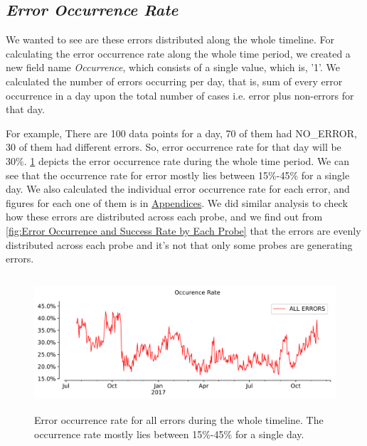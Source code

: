 \subsection*{\textit{Error Occurrence Rate}}

We wanted to see are these errors distributed along the whole timeline. For calculating the error occurrence rate along the whole time period, we created a new field name \textit{Occurrence}, which consists of a single value, which is, '1'.
We calculated the number of errors occurring per day, that is, sum of every error occurrence in a day upon the total number of cases i.e. error plus non-errors for that day.

For example, There are 100 data points for a day, 70 of them had NO\_ERROR, 30 of them had different errors. So, error occurrence rate for that day will be 30\%. 
\cref{fig:Occurrence Rate All Errors} depicts the error occurrence rate during the whole time period.  We can see that the occurrence rate for error mostly lies between 15\%-45\% for a single day. 
We also calculated the individual error occurrence rate for each error, and figures for each one of them is in \hyperref[chapter:appdataset]{Appendices}.  
We did similar analysis to check how these errors are distributed across each probe, and we find out from \cref{fig:Error Occurrence and Success Rate by Each Probe} that the errors are evenly distributed across each probe and it's not that only some probes are generating errors.
\begin{figure}[!ht]
	\centering
	\includegraphics[keepaspectratio, height=5cm, width=15cm]{figures/errors/netflix-occurence-rate-timeseries-all-errors.pdf}
	\caption[Error Occurrence Rate for All Errors]{Error occurrence rate for all errors during the whole timeline. The occurrence rate mostly lies between 15\%-45\% for a single day.}
	\label{fig:Occurrence Rate All Errors}
\end{figure}
